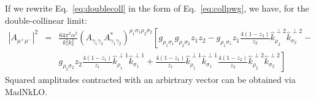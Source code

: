 \documentclass[a4paper,10pt]{article}
\begin{document}
If we rewrite Eq.~\ref{eq:doublecoll} in the form of Eq.~\ref{eq:collpwg}, we have, for the double-collinear limit:
\begin{eqnarray}
|A_{\mu^+ \mu^-} |^2 &=& \frac{64\pi^2\alpha^2}{k_1^2 k_2^2}
\left(A_{\gamma_1 \gamma_2}A_{\gamma_1 \gamma_2}^* \right)^{\rho_1\sigma_1\rho_2\sigma_2}
\left[g_{\rho_1\sigma_1}g_{\rho_2\sigma_2} z_1 z_2 -  
 g_{\rho_1\sigma_1} z_1 \frac{4(1-z_2)}{z_2} \hat k^{\perp2}_{\rho_2} \hat k^{\perp2}_{\sigma_2} -\right.\nonumber\\
  &&  \left.   g_{\rho_2\sigma_2} z_2 \frac{4(1-z_1)}{z_1} \hat k^{\perp1}_{\rho_1} \hat k^{\perp1}_{\sigma_1} +
\frac{4(1-z_1)}{z_1} \hat k^{\perp1}_{\rho_1} \hat k^{\perp1}_{\sigma_1}\frac{4(1-z_2)}{z_2} \hat k^{\perp2}_{\rho_2} \hat k^{\perp2}_{\sigma_2}
\right]
\end{eqnarray}
Squared amplitudes contracted with an arbirtrary vector can be obtained via MadNkLO.
\end{document}
